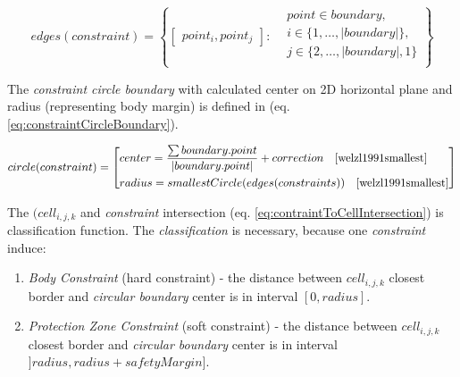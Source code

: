 \begin{equation}\label{eq:constraintEdgeSet}
    edges(constraint) =
    \left\{
    \begin{bmatrix}
        point_{i},point_{j}
    \end{bmatrix}:
    \begin{aligned}
    &point\in boundary,\\
    &i \in \{1,\dots,|boundary|\},\\
    &j \in \{2,\dots, |boundary|,1\}\\
    \end{aligned}
    \right\}
\end{equation}

\noindent The \emph{constraint circle boundary} with calculated center on 2D horizontal plane and radius (representing body margin) is defined in (eq. \ref{eq:constraintCircleBoundary}).

\begin{equation}\label{eq:constraintCircleBoundary}
    circle(constraint)=
    \left[
        \begin{aligned}
            & center = \frac{\sum boundary.point}{|boundary.point|} + correction \quad \cite{welzl1991smallest}\\
            & radius = smallest Circle(edges(constraints)) \quad\cite{welzl1991smallest}
        \end{aligned}
    \right]
\end{equation}

\noindent The $(cell_{i,j,k}$ and \emph{constraint} intersection (eq. \ref{eq:contraintToCellIntersection}) is classification function. The \emph{classification} is necessary, because one \emph{constraint} induce: 
\begin{enumerate}
    \item \emph{Body Constraint} (hard constraint) - the distance between $cell_{i,j,k}$ closest border and \emph{circular boundary} center is in interval $[0,radius]$.
    
    \item \emph{Protection Zone Constraint} (soft constraint) - the distance between $cell_{i,j,k}$ closest border and \emph{circular boundary} center is in interval $]radius,radius+safety Margin]$.
\end{enumerate}


